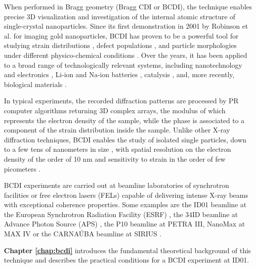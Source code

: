 When performed in Bragg geometry (Bragg CDI or BCDI), the technique enables precise 3D visualization and investigation 
of the internal atomic structure of single-crystal nanoparticles. Since its first demonstration in 2001 by Robinson 
et al. \cite{Robinson_gold_2001} for imaging gold nanoparticles, BCDI has proven to be a powerful tool for studying 
strain distributions \cite{pfeifer2006three, Robinson2009, Newton2010}, defect populations \cite{Favre-Nicolin_2010, Labat2015, Dupraz2017}, 
and particle morphologies under different physico-chemical conditions \cite{Carnis2021, FacetStrain2022, Chatelier2024, 
Grimes2024}. Over the years, it has been applied to a broad range of technologically relevant systems, including 
nanotechnology and electronics \cite{Favre-Nicolin_2010}, Li-ion and Na-ion batteries \cite{Singer2018, Serban2024}, 
catalysis \cite{atlan_imaging_2023}, and, more recently, biological materials \cite{Grunewald:ro5042}.

In typical experiments, the recorded diffraction patterns are processed by PR computer algorithms returning 
3D complex arrays, the modulus of which represents the electron density of the sample, while the phase is associated to
a component of the strain distribution inside the sample.  
Unlike other X-ray diffraction techniques, BCDI enables the study of isolated single particles, down to a few tens of 
nanometers in size \cite{MAXIV60nm, MIR20nm}, with spatial resolution on the electron density of the order of 10 nm \cite{cherukara_anisotropic_2018} 
and sensitivity to strain in the order of few picometers \cite{Labat2015}.

BCDI experiments are carried out at beamline laboratories of synchrotron facilities or free electron lasers (FELs) capable 
of delivering intense X-ray beams with exceptional coherence properties. Some examples are the ID01 beamline at the European 
Synchrotron Radiation Facility (ESRF) \cite{leake_nanodiffraction_2019}, the 34ID beamline at Advance Photon Source (APS) \cite{Pateras:yi5095}, the P10 beamline at PETRA III, 
NanoMax at MAX IV \cite{MAXIV60nm} or the CARNAÚBA beamline at SIRIUS \cite{Tolentino_2017}. 

\textbf{Chapter \ref*{chap:bcdi}} introduces the fundamental theoretical background of this technique and 
describes the practical conditions for a BCDI experiment at ID01.

